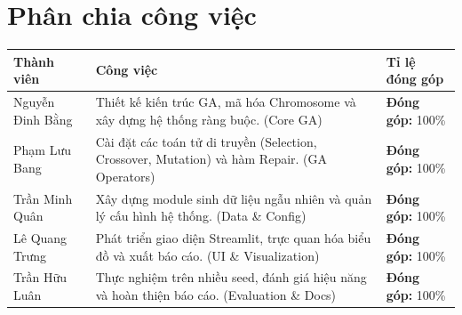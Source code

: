 \section*{Phân chia công việc}
\begin{longtable}{|p{4cm}|p{6cm}|p{4cm}|}
\hline
\textbf{Thành viên} & \textbf{Công việc} & \textbf{Tỉ lệ đóng góp} \\
\hline
Nguyễn Đinh Bằng 
& Thiết kế kiến trúc GA, mã hóa Chromosome và xây dựng hệ thống ràng buộc. (Core GA)
& \textbf{Đóng góp:} 100\% \\
\hline
Phạm Lưu Bang
& Cài đặt các toán tử di truyền (Selection, Crossover, Mutation) và hàm Repair. (GA Operators)
& \textbf{Đóng góp:} 100\% \\
\hline
Trần Minh Quân 
& Xây dựng module sinh dữ liệu ngẫu nhiên và quản lý cấu hình hệ thống. (Data \& Config)
& \textbf{Đóng góp:} 100\% \\
\hline
Lê Quang Trưng
& Phát triển giao diện Streamlit, trực quan hóa biểu đồ và xuất báo cáo. (UI \& Visualization)
& \textbf{Đóng góp:} 100\% \\
\hline
Trần Hữu Luân
& Thực nghiệm trên nhiều seed, đánh giá hiệu năng và hoàn thiện báo cáo. (Evaluation \& Docs)
& \textbf{Đóng góp:} 100\% \\
\hline
\end{longtable}
\normalsize
